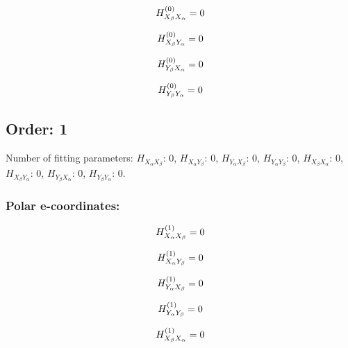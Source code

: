 \documentclass[fleqn]{article}
\begin{document}
\begin{dmath*}
H_{X_{\beta}X_{\alpha}}^{(0)}=0\\
\end{dmath*}

\begin{dmath*}
H_{X_{\beta}Y_{\alpha}}^{(0)}=0\\
\end{dmath*}

\begin{dmath*}
H_{Y_{\beta}X_{\alpha}}^{(0)}=0\\
\end{dmath*}

\begin{dmath*}
H_{Y_{\beta}Y_{\alpha}}^{(0)}=0\\
\end{dmath*}
\subsection{Order: 1}
Number of fitting parameters: $H_{X_{\alpha}X_{\beta}}$: $0$, $H_{X_{\alpha}Y_{\beta}}$: $0$, $H_{Y_{\alpha}X_{\beta}}$: $0$, $H_{Y_{\alpha}Y_{\beta}}$: $0$, $H_{X_{\beta}X_{\alpha}}$: $0$, $H_{X_{\beta}Y_{\alpha}}$: $0$, $H_{Y_{\beta}X_{\alpha}}$: $0$, $H_{Y_{\beta}Y_{\alpha}}$: $0$.
\subsubsection*{Polar e-coordinates:}

\begin{dmath*}
H_{X_{\alpha}X_{\beta}}^{(1)}=0\\
\end{dmath*}

\begin{dmath*}
H_{X_{\alpha}Y_{\beta}}^{(1)}=0\\
\end{dmath*}

\begin{dmath*}
H_{Y_{\alpha}X_{\beta}}^{(1)}=0\\
\end{dmath*}

\begin{dmath*}
H_{Y_{\alpha}Y_{\beta}}^{(1)}=0\\
\end{dmath*}

\begin{dmath*}
H_{X_{\beta}X_{\alpha}}^{(1)}=0\\
\end{dmath*}
\end{document}
